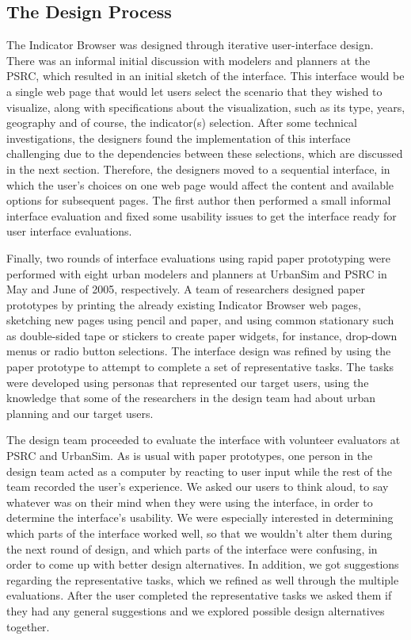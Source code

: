 \subsection{The Design Process} 

The Indicator Browser was designed through iterative user-interface design.
There was an informal initial discussion with modelers and planners at the
PSRC, which resulted in an initial sketch of the interface.  This interface
would be a single web page that would let users select the scenario that
they wished to visualize, along with specifications about the
visualization, such as its type, years, geography and of course, the
indicator(s) selection. After some technical investigations, the designers
found the implementation of this interface challenging due to the
dependencies between these selections, which are discussed 
in the next section. Therefore, the
designers moved to a sequential interface, in which the user's choices on
one web page would affect the content and available options for subsequent
pages.  The first author then performed a small informal interface
evaluation and fixed some usability issues to get the interface ready for
user interface evaluations.

Finally, two rounds of interface evaluations using rapid paper prototyping
were performed with eight urban modelers and planners at UrbanSim and
PSRC in May and June of 2005, respectively. A team of researchers
designed paper prototypes by printing the already existing Indicator
Browser web pages, sketching new pages using pencil and paper, and using
common stationary such as double-sided tape or stickers to create paper
widgets, for instance, drop-down menus or radio button selections.  The
interface design was refined by using the paper prototype to attempt to
complete a set of representative tasks. The tasks were developed using
personas that represented our target users, using the knowledge that some
of the researchers in the design team had about urban planning and our
target users.

The design team proceeded to evaluate the interface with volunteer
evaluators at PSRC and UrbanSim. As is usual with paper prototypes, one
person in the design team acted as a computer by reacting to user input
while the rest of the team recorded the user's experience. We asked our
users to think aloud, to say whatever was on their mind when they were
using the interface, in order to determine the interface's usability. We
were especially interested in determining which parts of the interface
worked well, so that we wouldn't alter them during the next round of
design, and which parts of the interface were confusing, in order to come
up with better design alternatives. In addition, we got suggestions
regarding the representative tasks, which we refined as well through the
multiple evaluations.  After the user completed the representative tasks we
asked them if they had any general suggestions and we explored possible
design alternatives together.
  
%

%

